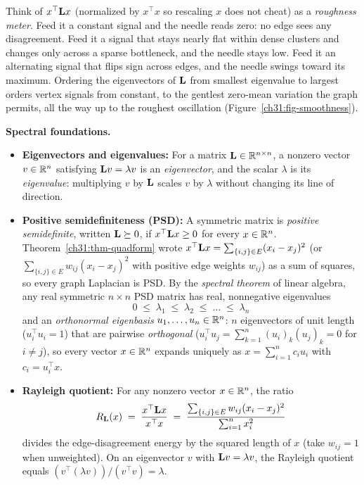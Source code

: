 \begin{intuitionbox}
Think of $x^\top \mathbf{L} x$ (normalized by $x^\top x$ so rescaling $x$ does not cheat) as a \emph{roughness meter}. Feed it a constant signal and the needle reads zero: no edge sees any disagreement. Feed it a signal that stays nearly flat within dense clusters and changes only across a sparse bottleneck, and the needle stays low. Feed it an alternating signal that flips sign across edges, and the needle swings toward its maximum. Ordering the eigenvectors of $\mathbf{L}$ from smallest eigenvalue to largest orders vertex signals from constant, to the gentlest zero-mean variation the graph permits, all the way up to the roughest oscillation (Figure~\ref{ch31:fig-smoothness}).
\end{intuitionbox}

\begin{formalbox}
\textbf{Spectral foundations.}
\begin{itemize}
  \item \textbf{Eigenvectors and eigenvalues:} For a matrix $\mathbf{L} \in \mathbb{R}^{n\times n}$, a nonzero vector $v \in \mathbb{R}^n$ satisfying $\mathbf{L} v = \lambda v$ is an \emph{eigenvector}, and the scalar $\lambda$ is its \emph{eigenvalue}: multiplying $v$ by $\mathbf{L}$ scales $v$ by $\lambda$ without changing its line of direction.
  \item \textbf{Positive semidefiniteness (PSD):} A symmetric matrix is \emph{positive semidefinite}, written $\mathbf{L} \succeq 0$, if $x^\top \mathbf{L} x \ge 0$ for every $x\in\mathbb{R}^n$. Theorem~\ref{ch31:thm-quadform} wrote $x^\top \mathbf{L} x = \sum_{\{i,j\}\in E} (x_i - x_j)^2$ (or $\sum_{\{i,j\}\in E} w_{ij}(x_i - x_j)^2$ with positive edge weights $w_{ij}$) as a sum of squares, so every graph Laplacian is PSD. By the \emph{spectral theorem} of linear algebra, any real symmetric $n\times n$ PSD matrix has real, nonnegative eigenvalues
  \[
    0 \;\le\; \lambda_1 \;\le\; \lambda_2 \;\le\; \dots \;\le\; \lambda_n
  \]
  and an \emph{orthonormal eigenbasis} $u_1,\dots,u_n \in \mathbb{R}^n$: $n$ eigenvectors of unit length ($u_i^\top u_i = 1$) that are pairwise \emph{orthogonal} ($u_i^\top u_j = \sum_{k=1}^n (u_i)_k (u_j)_k = 0$ for $i\neq j$), so every vector $x\in\mathbb{R}^n$ expands uniquely as $x = \sum_{i=1}^n c_i u_i$ with $c_i = u_i^\top x$.
  \item \textbf{Rayleigh quotient:} For any nonzero vector $x \in \mathbb{R}^n$, the ratio
  \[
    R_{\mathbf{L}}(x) \;=\; \frac{x^\top \mathbf{L} x}{x^\top x} \;=\; \frac{\sum_{\{i,j\}\in E} w_{ij}(x_i - x_j)^2}{\sum_{i=1}^n x_i^2}
  \]
  divides the edge-disagreement energy by the squared length of $x$ (take $w_{ij}=1$ when unweighted). On an eigenvector $v$ with $\mathbf{L} v = \lambda v$, the Rayleigh quotient equals $(v^\top(\lambda v))/(v^\top v) = \lambda$.

\end{itemize}
\end{formalbox}
